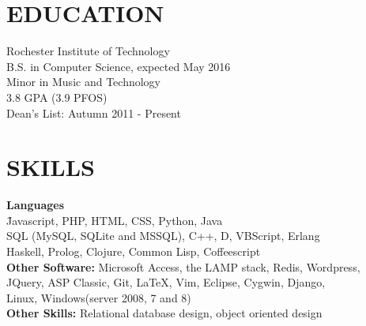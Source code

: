 \documentclass[line,margin]{res}
\begin{document}
\address{6000 Reynolds Dr, \#1482\\ Rochester, NY 14623}
\address{(646) 320-9143\\leeavital@gmail.com}


\begin{resume}
 
\section{EDUCATION}  Rochester Institute of Technology \\ 
                     B.S. in  Computer Science,  expected May 2016 \\
	                 Minor in Music and Technology\\
	                 3.8 GPA (3.9 PFOS) \\
	                 Dean's List: Autumn 2011 - Present
 \section{SKILLS} \vspace{-2ex}
	\begin{tabbing}
	  
	  
    {\bf Languages } \hspace{.5in} \= \\  
	\hspace{.2in}{\sl Very Experienced} \hspace{.5in}	\= Javascript, PHP, HTML, CSS, Python, Java\\  
	\hspace{.2in}{\sl Proficient} \> SQL (MySQL, SQLite and MSSQL), C++, D, VBScript, Erlang\\	
	\hspace{.2in}{\sl Less Experienced} \> Haskell, Prolog, Clojure, Common Lisp, Coffeescript\\
	  	
	{\bf Other Software:}           \> Microsoft Access, the LAMP stack, Redis, Wordpress,  \\ 
				                    \>	JQuery, ASP Classic, Git, \LaTeX, Vim, Eclipse, Cygwin, Django, \\
				                    \>  Linux, Windows(server 2008, 7 and 8) \\
	
	{\bf Other Skills:} \> Relational database design, object oriented design \\
	

\end{tabbing}
\end{resume}
\end{document}
